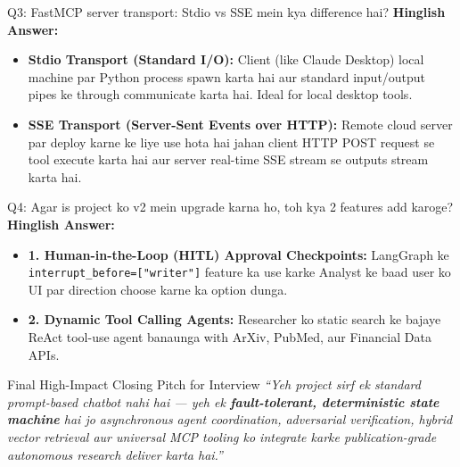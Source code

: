\documentclass[9.5pt, a4paper]{article}
\begin{document}
\begin{interviewbox}{Q3: FastMCP server transport: Stdio vs SSE mein kya difference hai?}
\textbf{Hinglish Answer:}
\begin{itemize}
    \item \textbf{Stdio Transport (Standard I/O):} Client (like Claude Desktop) local machine par Python process spawn karta hai aur standard input/output pipes ke through communicate karta hai. Ideal for local desktop tools.
    \item \textbf{SSE Transport (Server-Sent Events over HTTP):} Remote cloud server par deploy karne ke liye use hota hai jahan client HTTP POST request se tool execute karta hai aur server real-time SSE stream se outputs stream karta hai.
\end{itemize}
\end{interviewbox}

\begin{interviewbox}{Q4: Agar is project ko v2 mein upgrade karna ho, toh kya 2 features add karoge?}
\textbf{Hinglish Answer:}
\begin{itemize}
    \item \textbf{1. Human-in-the-Loop (HITL) Approval Checkpoints:} LangGraph ke \texttt{interrupt\_before=["writer"]} feature ka use karke Analyst ke baad user ko UI par direction choose karne ka option dunga.
    \item \textbf{2. Dynamic Tool Calling Agents:} Researcher ko static search ke bajaye ReAct tool-use agent banaunga with ArXiv, PubMed, aur Financial Data APIs.
\end{itemize}
\end{interviewbox}

\vspace{4pt}
\begin{summarybox}{Final High-Impact Closing Pitch for Interview}
\textit{``Yeh project sirf ek standard prompt-based chatbot nahi hai — yeh ek \textbf{fault-tolerant, deterministic state machine} hai jo asynchronous agent coordination, adversarial verification, hybrid vector retrieval aur universal MCP tooling ko integrate karke publication-grade autonomous research deliver karta hai.''}
\end{summarybox}
\end{document}
